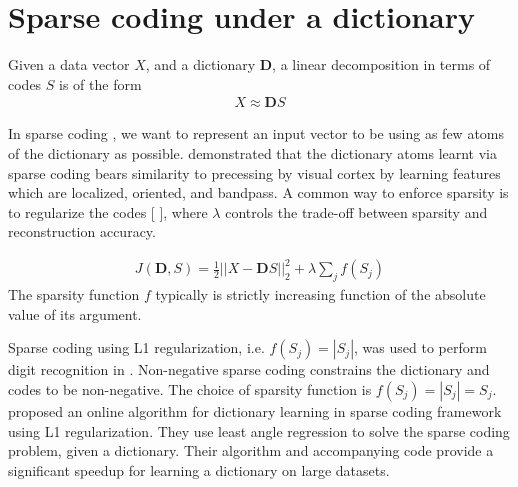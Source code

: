 \section{Sparse coding under a dictionary}

Given a data vector $X$, and a dictionary $\mathbf{D}$, a linear decomposition in terms of codes $S$ is of the form 
\begin{align}
    X \approx \mathbf{D} S \label{eqn:lineardecomp}
\end{align}

In sparse coding \cite{harpur1996sc}, we want to represent an input vector to be using as few atoms of the dictionary as possible. \cite{olshausen1996sparse} demonstrated that the dictionary atoms learnt via sparse coding bears similarity to precessing by visual cortex by learning features which are localized, oriented, and bandpass. A common way to enforce sparsity is to regularize the codes [  ], where $\lambda$ controls the trade-off between sparsity and reconstruction accuracy.

\begin{align}
    J(\mathbf{D}, S) = \frac{1}{2} || X - \mathbf{D} S ||_2^2 + \lambda \sum_{j} f(S_{j}) \label{eqn:sparsecoding}
\end{align}
The sparsity function $f$ typically is strictly increasing function of the absolute value of its argument. 


Sparse coding using L1 regularization, i.e. $f(S_{j}) = | S_{j} |$, was used to perform digit recognition in \cite{mairal2009supervised}. Non-negative sparse coding \cite{hoyer2002nnsc} constrains the dictionary and codes to be non-negative. The choice of sparsity function is $f(S_{j}) = | S_{j} | = S_{j}$. \cite{mairal2009online} proposed an online algorithm for dictionary learning in sparse coding framework using L1 regularization. They use least angle regression to solve the sparse coding problem, given a dictionary. Their algorithm and accompanying code provide a significant speedup for learning a  dictionary on large datasets.

